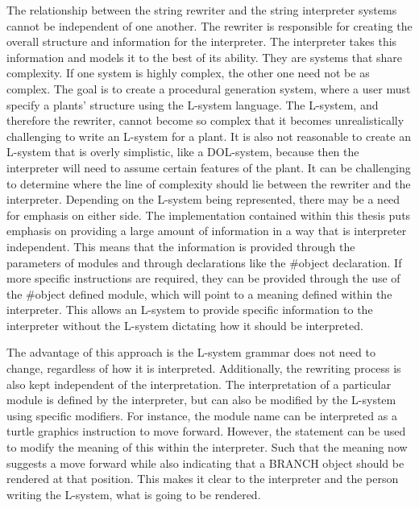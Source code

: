 The relationship between the string rewriter and the string interpreter systems cannot be independent of one another. The rewriter is responsible for creating the overall structure and information for the interpreter. The interpreter takes this information and models it to the best of its ability. They are systems that share complexity. If one system is highly complex, the other one need not be as complex. The goal is to create a procedural generation system, where a user must specify a plants' structure using the L-system language. The L-system, and therefore the rewriter, cannot become so complex that it becomes unrealistically challenging to write an L-system for a plant. It is also not reasonable to create an L-system that is overly simplistic, like a DOL-system, because then the interpreter will need to assume certain features of the plant.  It can be challenging to determine where the line of complexity should lie between the rewriter and the interpreter. Depending on the L-system being represented, there may be a need for emphasis on either side. The implementation contained within this thesis puts emphasis on providing a large amount of information in a way that is interpreter independent. This means that the information is provided through the parameters of modules and through declarations like the \#object declaration. If more specific instructions are required, they can be provided through the use of the \#object defined module, which will point to a meaning defined within the interpreter. This allows an L-system to provide specific information to the interpreter without the L-system dictating how it should be interpreted.

The advantage of this approach is the L-system grammar does not need to change, regardless of how it is interpreted. Additionally, the rewriting process is also kept independent of the interpretation. The interpretation of a particular module is defined by the interpreter, but can also be modified by the L-system using specific modifiers. For instance, the module name  can be interpreted as a turtle graphics instruction to move forward. However, the statement  can be used to modify the meaning of this within the interpreter. Such that the meaning now suggests a move forward while also indicating that a BRANCH object should be rendered at that position. This makes it clear to the interpreter and the person writing the L-system, what is going to be rendered.
